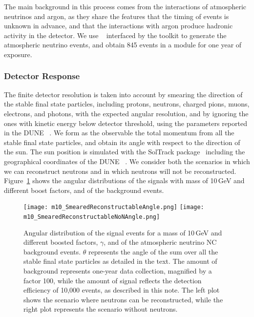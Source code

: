 The main background in this process comes from the  
interactions of atmospheric neutrinos and argon,
as they share the features that the timing of events is unknown in advance,
and that the interactions with argon produce hadronic activity in the detector.
We use ~\cite{Andreopoulos:2009rq,Andreopoulos:2015wxa}
interfaced by the  toolkit to generate the  atmospheric
neutrino events, and obtain 845 events in a \nominalmodsize{} module for one year of
exposure.

\subsubsection{Detector Response}
\label{sec:detector_resp}

The finite detector resolution is taken into
account by smearing the direction of the stable final state particles, 
including protons, neutrons, charged pions, muons, electrons, and photons,
with the expected angular resolution,
and by ignoring the ones with kinetic energy below detector threshold,
using the parameters reported in the DUNE ~\cite{Acciarri:2015uup}.
We form as the observable the total momentum from all the stable final state particles,
and obtain its angle with respect to the direction of the sun.
The sun position is simulated with the SolTrack package~\cite{SolTrack}
including the geographical coordinates of the DUNE ~\cite{DUNE_DocDB136}.
We consider both the scenarios in which we can reconstruct neutrons and in which 
neutrons will not be reconstructed.
Figure~\ref{fig:m10_SmearedReconstructableAngle} shows the angular distributions of
the  signals with mass of 10\,GeV and different boost factors,
and of the background events.

\begin{figure}[!htb]
\centering
\texttt{[image: m10\_SmearedReconstructableAngle.png]}
\texttt{[image: m10\_SmearedReconstructableNoNAngle.png]}
\caption[Angular distribution of the BDM signal events for a BDM mass of 10\,GeV]{Angular distribution of the  signal events for a  mass of 10\,GeV
and different boosted factors, $\gamma$, and of the atmospheric neutrino NC
background events.
$\theta$ represents the angle of the sum over all the stable final state
particles as detailed in the text.
The amount of background represents one-year data collection, magnified by a factor 100,
while the amount of signal reflects the detection efficiency of 10,000  events, as
described in this note.
The left plot shows the scenario where neutrons can be reconstructed,
while the right plot represents the scenario without neutrons.}
\label{fig:m10_SmearedReconstructableAngle}
\end{figure}



